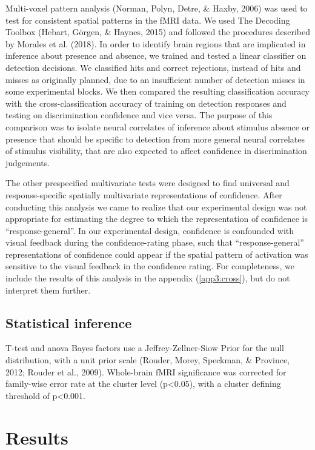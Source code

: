 \documentclass[12pt,twoside]{reedthesis}
\begin{document}
Multi-voxel pattern analysis (Norman, Polyn, Detre, \& Haxby, 2006) was used to test for consistent spatial patterns in the fMRI data. We used The Decoding Toolbox (Hebart, Görgen, \& Haynes, 2015) and followed the procedures described by Morales et al. (2018). In order to identify brain regions that are implicated in inference about presence and absence, we trained and tested a linear classifier on detection decisions. We classified hits and correct rejections, instead of hits and misses as originally planned, due to an insufficient number of detection misses in some experimental blocks. We then compared the resulting classification accuracy with the cross-classification accuracy of training on detection responses and testing on discrimination confidence and vice versa. The purpose of this comparison was to isolate neural correlates of inference about stimulus absence or presence that should be specific to detection from more general neural correlates of stimulus visibility, that are also expected to affect confidence in discrimination judgements.

The other prespecified multivariate tests were designed to find universal and response-specific spatially multivariate representations of confidence. After conducting this analysis we came to realize that our experimental design was not appropriate for estimating the degree to which the representation of confidence is ``response-general''. In our experimental design, confidence is confounded with visual feedback during the confidence-rating phase, such that ``response-general'' representations of confidence could appear if the spatial pattern of activation was sensitive to the visual feedback in the confidence rating. For completeness, we include the results of this analysis in the appendix (\ref{app3:cross}), but do not interpret them further.

\hypertarget{statistical-inference-1}{%
\subsection{Statistical inference}\label{statistical-inference-1}}

T-test and anova Bayes factors use a Jeffrey-Zellner-Siow Prior for the null distribution, with a unit prior scale (Rouder, Morey, Speckman, \& Province, 2012; Rouder et al., 2009). Whole-brain fMRI significance was corrected for family-wise error rate at the cluster level (p\textless0.05), with a cluster defining threshold of p\textless0.001.

\hypertarget{results-7}{%
\section{Results}\label{results-7}}
\end{document}
